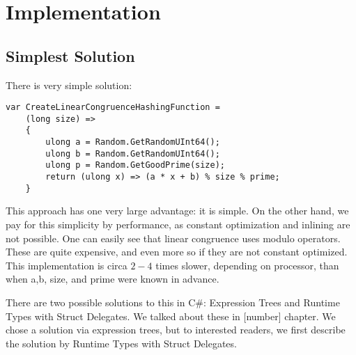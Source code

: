 \section{Implementation}
\subsection{Simplest Solution}
There is very simple solution:
\begin{lstlisting}
var CreateLinearCongruenceHashingFunction = 
    (long size) =>
    {
        ulong a = Random.GetRandomUInt64();
        ulong b = Random.GetRandomUInt64();
        ulong p = Random.GetGoodPrime(size);
        return (ulong x) => (a * x + b) % size % prime;
    }
\end{lstlisting}
This approach has one very large advantage: it is simple. On the other hand, we pay for this simplicity by performance, as constant optimization and inlining are not possible. One can easily see that linear congruence uses modulo operators. These are quite expensive, and even more so if they are not constant optimized. This implementation is circa $2-4$ times slower, depending on processor, than when a,b, size, and prime were known in advance.

There are two possible solutions to this in C\#: Expression Trees and Runtime Types with Struct Delegates. We talked about these in [number] chapter. We chose a solution via expression trees, but to interested readers, we first describe the solution by Runtime Types with Struct Delegates. 

